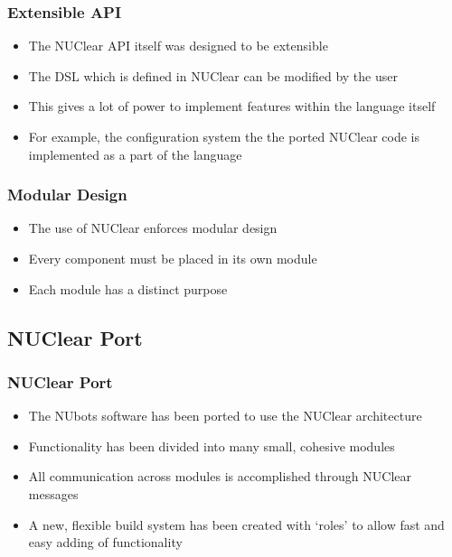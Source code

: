 \documentclass{beamer}
\begin{document}
\begin{frame}
	\frametitle{Extensible API}
	\begin{itemize}
		\item The NUClear API itself was designed to be extensible
		\item The DSL which is defined in NUClear can be modified by the user
		\item This gives a lot of power to implement features within the language itself
		\item For example, the configuration system the the ported NUClear code is implemented as a part of the language
	\end{itemize}
\end{frame}

\begin{frame}
	\frametitle{Modular Design}
	\begin{itemize}
		\item The use of NUClear enforces modular design
		\item Every component must be placed in its own module
		\item Each module has a distinct purpose
	\end{itemize}
\end{frame}


\subsection{NUClear Port}
\begin{frame}
	\frametitle{NUClear Port}

	\begin{itemize}
		\item The NUbots software has been ported to use the NUClear architecture
		\item Functionality has been divided into many small, cohesive modules
		\item All communication across modules is accomplished through NUClear messages
		\item A new, flexible build system has been created with `roles' to allow fast and easy adding of functionality
	\end{itemize}
\end{frame}
\end{document}
